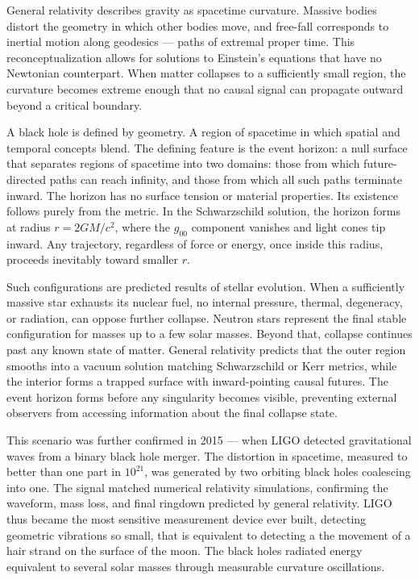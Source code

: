General relativity describes gravity as spacetime curvature. Massive bodies distort the geometry in which other bodies move, and free-fall corresponds to inertial motion along geodesics — paths of extremal proper time. This reconceptualization allows for solutions to Einstein's equations that have no Newtonian counterpart. When matter collapses to a sufficiently small region, the curvature becomes extreme enough that no causal signal can propagate outward beyond a critical boundary.

A black hole is defined by geometry. A region of spacetime in which spatial and temporal concepts blend. The defining feature is the event horizon: a null surface that separates regions of spacetime into two domains: those from which future-directed paths can reach infinity, and those from which all such paths terminate inward. The horizon has no surface tension or material properties. Its existence follows purely from the metric. In the Schwarzschild solution, the horizon forms at radius $r = 2GM/c^2$, where the $g_{00}$ component vanishes and light cones tip inward. Any trajectory, regardless of force or energy, once inside this radius, proceeds inevitably toward smaller $r$. 

Such configurations are predicted results of stellar evolution. When a sufficiently massive star exhausts its nuclear fuel, no internal pressure, thermal, degeneracy, or radiation, can oppose further collapse. Neutron stars represent the final stable configuration for masses up to a few solar masses. Beyond that, collapse continues past any known state of matter. General relativity predicts that the outer region smooths into a vacuum solution matching Schwarzschild or Kerr metrics, while the interior forms a trapped surface with inward-pointing causal futures. The event horizon forms before any singularity becomes visible, preventing external observers from accessing information about the final collapse state.

This scenario was further confirmed in 2015 — when LIGO detected gravitational waves from a binary black hole merger. The distortion in spacetime, measured to better than one part in $10^{21}$, was generated by two orbiting black holes coalescing into one. The signal matched numerical relativity simulations, confirming the waveform, mass loss, and final ringdown predicted by general relativity. LIGO thus became the most sensitive measurement device ever built, detecting geometric vibrations so small, that is equivalent to detecting a the movement of a hair strand on the surface of the moon. The black holes radiated energy equivalent to several solar masses through measurable curvature oscillations.

